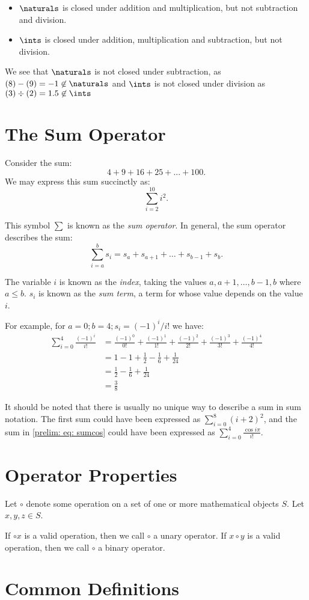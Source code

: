 \documentclass[../proofs.tex]{subfiles}
\begin{document}
  \begin{itemize}
    \item $\naturals$ is closed under addition and multiplication, but not
    subtraction and division.
    \item $\ints$ is closed under addition, multiplication and subtraction, but
    not division.
  \end{itemize}

  We see that $\naturals$ is not closed under subtraction, as
  $(8) - (9) = -1 \not \in \naturals$ and $\ints$ is not closed under division
  as $(3) \div (2) = 1.5 \not\in \ints $

\section{The Sum Operator}
  \newcommand{\negfrac}[1]{\frac{ (-1)^{#1} }{ #1! } }

  Consider the sum: $$ 4 + 9 + 16 + 25 + ... + 100. $$
  We may express this sum succinctly as: $$ \sum_{i=2}^{10}{i^2}. $$

  This symbol $\sum$ is known as the \emph{sum operator}. In general, the sum
  operator describes the sum:
  $$ \sum_{i=a}^{b}{s_i} = s_a + s_{a+1} + \ldots + s_{b-1} + s_b. $$

  The variable $i$ is known as the \emph{index}, taking the values
  $a, a+1, \ldots, b-1, b$ where $a \leq b$. $s_i$ is known as the
  \emph{sum term}, a term for whose value depends on the value $i$.

  For example, for $a = 0; b = 4; s_i = (-1)^i/i!$ we have:
  \begin{align}
    \sum_{i=0}^{4}{\frac{(-1)^i}{i!}}
      &= \negfrac{0} + \negfrac{1} + \negfrac{2}
      + \negfrac{3} + \negfrac{4}  \label{prelim: eq: sumcos} \\
      &= 1 - 1 + \frac{1}{2} - \frac{1}{6} + \frac{1}{24} \\
      &= \frac{1}{2} - \frac{1}{6} + \frac{1}{24} \\
      &= \frac{3}{8}
  \end{align}

  It should be noted that there is usually no unique way to describe a sum in
  sum notation. The first sum could have been expressed as
  $\sum_{i=0}^{8}{(i+2)^2}$, and the sum in \ref{prelim: eq: sumcos} could have
  been expressed as $\sum_{i=0}^{4}{ \frac{\cos{i\pi}} {i!} }.$

  \section{Operator Properties}
  \newcommand{\op}{\circ}
  Let $\op$ denote some operation on a set of one or more mathematical
  objects $S$. Let $x, y, z \in S$.

  If $\op x$ is a valid operation, then we call $\op$ a unary operator. If
  $x \op y$ is a valid operation, then we call $\op$ a binary operator.




  \section{Common Definitions}
\end{document}
